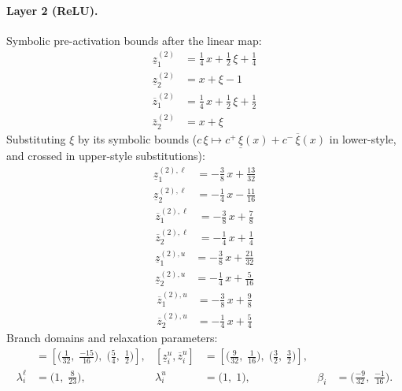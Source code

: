 \documentclass[11pt]{article}
\begin{document}
\paragraph{Layer 2 (ReLU).}
Symbolic pre-activation bounds after the linear map:
\begin{align*}
\underline{z}^{(2)}_{1} &= \frac{1}{4}\,x + \frac{1}{2}\,\xi + \frac{1}{4} \\
\underline{z}^{(2)}_{2} &= x + \xi - 1
\end{align*}
\begin{align*}
\overline{z}^{(2)}_{1} &= \frac{1}{4}\,x + \frac{1}{2}\,\xi + \frac{1}{2} \\
\overline{z}^{(2)}_{2} &= x + \xi
\end{align*}
Substituting $\xi$ by its symbolic bounds ($c\,\xi \mapsto c^{+}\,\underline{\xi}(x) + c^{-}\,\overline{\xi}(x)$ in lower-style, and crossed in upper-style substitutions):
\begin{align*}
\underline{z}^{(2),\ell}_{1} &= -\frac{3}{8}\,x + \frac{13}{32} \\
\underline{z}^{(2),\ell}_{2} &= -\frac{1}{4}\,x - \frac{11}{16}
\end{align*}
\begin{align*}
\overline{z}^{(2),\ell}_{1} &= -\frac{3}{8}\,x + \frac{7}{8} \\
\overline{z}^{(2),\ell}_{2} &= -\frac{1}{4}\,x + \frac{1}{4}
\end{align*}
\begin{align*}
\underline{z}^{(2),u}_{1} &= -\frac{3}{8}\,x + \frac{21}{32} \\
\underline{z}^{(2),u}_{2} &= -\frac{1}{4}\,x + \frac{5}{16}
\end{align*}
\begin{align*}
\overline{z}^{(2),u}_{1} &= -\frac{3}{8}\,x + \frac{9}{8} \\
\overline{z}^{(2),u}_{2} &= -\frac{1}{4}\,x + \frac{5}{4}
\end{align*}
Branch domains and relaxation parameters:
\begin{align*}
[\underline{z}^{\ell}_i, \overline{z}^{\ell}_i] &= [\bigl(\frac{1}{32},\; \frac{-15}{16}\bigr),\; \bigl(\frac{5}{4},\; \frac{1}{2}\bigr)], & [\underline{z}^{u}_i, \overline{z}^{u}_i] &= [\bigl(\frac{9}{32},\; \frac{1}{16}\bigr),\; \bigl(\frac{3}{2},\; \frac{3}{2}\bigr)], \\
\lambda^{\ell}_i &= \bigl(1,\; \frac{8}{23}\bigr), & \lambda^{u}_i &= \bigl(1,\; 1\bigr), & \beta_i &= \bigl(\frac{-9}{32},\; \frac{-1}{16}\bigr).
\end{align*}
\end{document}
